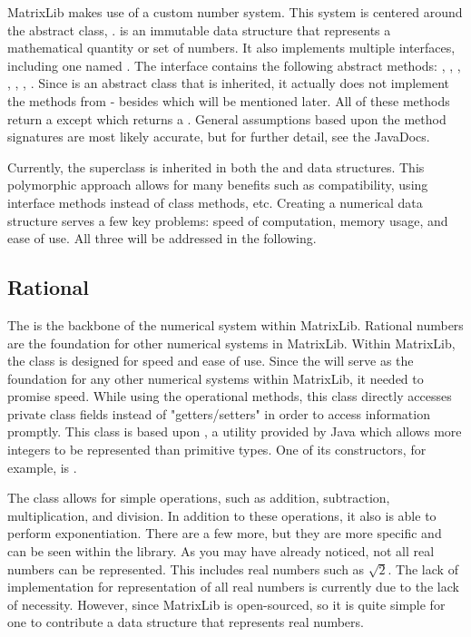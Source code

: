 MatrixLib makes use of a custom number system.
This system is centered around the abstract class, .
 is an immutable data structure that represents a mathematical quantity or set of numbers.
It also implements multiple interfaces, including one named .
The  interface contains the following abstract methods:
, , ,
, , , .
Since  is an abstract class that is inherited,
it actually does not implement the methods from  - besides  which will be mentioned later.
All of these methods return a  except  which returns a .
General assumptions based upon the method signatures are most likely accurate, but for further detail, see the JavaDocs.

Currently, the  superclass is inherited in both the  and  data structures.
This polymorphic approach allows for many benefits such as compatibility, using interface methods instead of class methods, etc.
Creating a numerical data structure serves a few key problems: speed of computation, memory usage, and ease of use.
All three will be addressed in the following.

\subsection*{Rational}
The  is the backbone of the numerical system within MatrixLib.
Rational numbers are the foundation for other numerical systems in MatrixLib.
Within MatrixLib, the  class is designed for speed and ease of use.
Since the  will serve as the foundation for any other numerical systems within MatrixLib, it needed to promise speed.
While using the operational methods, this class directly accesses private class fields instead of "getters/setters" in order to access information promptly.
This class is based upon , a utility provided by Java which allows more integers to be represented than primitive types.
One of its constructors, for example, is .

The  class allows for simple operations, such as addition, subtraction, multiplication, and division.
In addition to these operations, it also is able to perform exponentiation.
There are a few more, but they are more specific and can be seen within the library.
As you may have already noticed, not all real numbers can be represented.
This includes real numbers such as $\sqrt{2}$.
The lack of implementation for representation of all real numbers is currently due to the lack of necessity.
However, since MatrixLib is open-sourced, so it is quite simple for one to contribute a data structure that represents real numbers.

